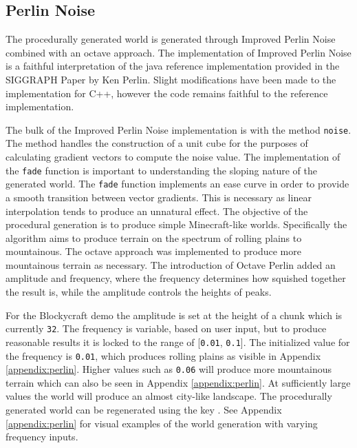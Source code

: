 \documentclass[a4paper,11pt,titlepage]{scrartcl}
\newcommand{\Blockycraft}{Blockycraft}
\begin{document}
\subsection{Perlin Noise}
\label{section:perlin}
The procedurally generated world is generated through Improved Perlin Noise combined with an octave approach. The implementation of Improved Perlin Noise is a faithful interpretation of the java reference implementation provided in the SIGGRAPH Paper by Ken Perlin. Slight modifications have been made to the implementation for C++, however the code remains faithful to the reference implementation.

The bulk of the Improved Perlin Noise implementation is with the method \texttt{noise}. The method handles the construction of a unit cube for the purposes of calculating gradient vectors to compute the noise value. The implementation of the \texttt{fade} function is important to understanding the sloping nature of the generated world. The \texttt{fade} function implements an ease curve in order to provide a smooth transition between vector gradients. This is necessary as linear interpolation tends to produce an unnatural effect. The objective of the procedural generation is to produce simple Minecraft-like worlds. Specifically the algorithm aims to produce terrain on the spectrum of rolling plains to mountainous. The octave approach was implemented to produce more mountainous terrain as necessary. The introduction of Octave Perlin added an amplitude and frequency, where the frequency determines how squished together the result is, while the amplitude controls the heights of peaks.
    
For the \Blockycraft{} demo the amplitude is set at the height of a chunk which is currently \texttt{32}. The frequency is variable, based on user input, but to produce reasonable results it is locked to the range of [\texttt{0.01}, \texttt{0.1}]. The initialized value for the frequency is \texttt{0.01}, which produces rolling plains as visible in Appendix \ref{appendix:perlin}. Higher values such as \texttt{0.06} will produce more mountainous terrain which can also be seen in Appendix \ref{appendix:perlin}. At sufficiently large values the world will produce an almost city-like landscape.
\vskip 2.5mm\noindent
The procedurally generated world can be regenerated using the key . See Appendix \ref{appendix:perlin} for visual examples of the world generation with varying frequency inputs.
    
\end{document}
